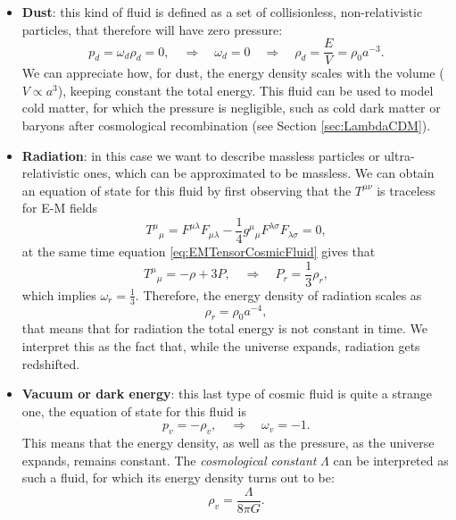 \begin{itemize}
    \item \textbf{Dust}: this kind of fluid is defined as a set of collisionless, non-relativistic particles, that therefore will have zero pressure:$$p_d=\omega_d\rho_d=0,\quad\Rightarrow\quad \omega_d=0\quad\Rightarrow\quad\rho_d=\frac{E}{V}=\rho_{0}a^{-3}.$$ We can appreciate how, for dust, the energy density scales with the volume ($V \propto  a^3$), keeping constant the total energy. This fluid can be used to model cold matter, for which the pressure is negligible, such as cold dark matter or baryons after cosmological recombination (see Section \ref{sec:LambdaCDM}).
    \item \textbf{Radiation}: in this case we want to describe massless particles or ultra-relativistic ones, which can be approximated to be massless. We can obtain an equation of state for this fluid by first observing that the $T^{\mu\nu}$ is traceless for E-M fields $$T^\mu\phantom{}_\mu=F^{\mu\lambda}F_{\mu\lambda}-\frac{1}{4}g^\mu\phantom{}_\mu F^{\lambda\sigma}F_{\lambda\sigma}=0,$$ at the same time equation \eqref{eq:EMTensorCosmicFluid} gives that $$T^\mu\phantom{}_\mu=-\rho+3P,\quad\Rightarrow\quad P_r=\frac{1}{3}\rho_r,$$ which implies $\omega_r=\frac{1}{3}$. Therefore, the energy density of radiation scales as$$\rho_r=\rho_0a^{-4},$$ that means that for radiation the total energy is not constant in time. We interpret this as the fact that, while the universe expands, radiation gets redshifted.
    \item \textbf{Vacuum or dark energy}: this last type of cosmic fluid is quite a strange one, the equation of state for this fluid is $$p_v=-\rho_v,\quad \Rightarrow\quad \omega_v=-1.$$ This means that the energy density, as well as the pressure, as the universe expands, remains constant. The \emph{cosmological constant} $\Lambda$ can be interpreted as such a fluid, for which its energy density turns out to be: $$\rho_v=\frac{\Lambda}{8\pi G}.$$
\end{itemize}
